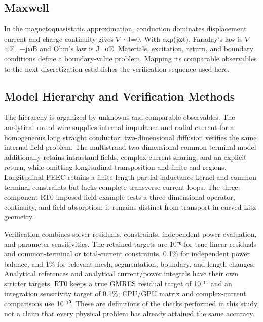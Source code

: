 \documentclass[journal,10pt]{IEEEtran}
\begin{document}
\subsection*{Maxwell}
\hypertarget{02.maxwell.heading}{}
In the magnetoquasistatic approximation, conduction dominates displacement current and charge continuity gives \(\nabla\)·J=0. With exp(jωt), Faraday’s law is \(\nabla\)×E=−jωB and Ohm’s law is J=σE. Materials, excitation, return, and boundary conditions define a boundary-value problem. Mapping its comparable observables to the next discretization establishes the verification sequence used here.


\subsection*{Model Hierarchy and Verification Methods}
\hypertarget{02.hierarchy.heading}{}
The hierarchy is organized by unknowns and comparable observables. The analytical round wire supplies internal impedance and radial current for a homogeneous long straight conductor; two-dimensional diffusion verifies the same internal-field problem. The multistrand two-dimensional common-terminal model additionally retains intrastand fields, complex current sharing, and an explicit return, while omitting longitudinal transposition and finite end regions. Longitudinal PEEC retains a finite-length partial-inductance kernel and common-terminal constraints but lacks complete transverse current loops. The three-component RT0 imposed-field example tests a three-dimensional operator, continuity, and field absorption; it remains distinct from transport in curved Litz geometry.


Verification combines solver residuals, constraints, independent power evaluation, and parameter sensitivities. The retained targets are 10⁻⁸ for true linear residuals and common-terminal or total-current constraints, 0.1\% for independent power balance, and 1\% for relevant mesh, segmentation, boundary, and length changes. Analytical references and analytical current/power integrals have their own stricter targets. RT0 keeps a true GMRES residual target of 10⁻¹¹ and an integration sensitivity target of 0.1\%; CPU/GPU matrix and complex-current comparisons use 10⁻¹⁰. These are definitions of the checks performed in this study, not a claim that every physical problem has already attained the same accuracy.
\end{document}
